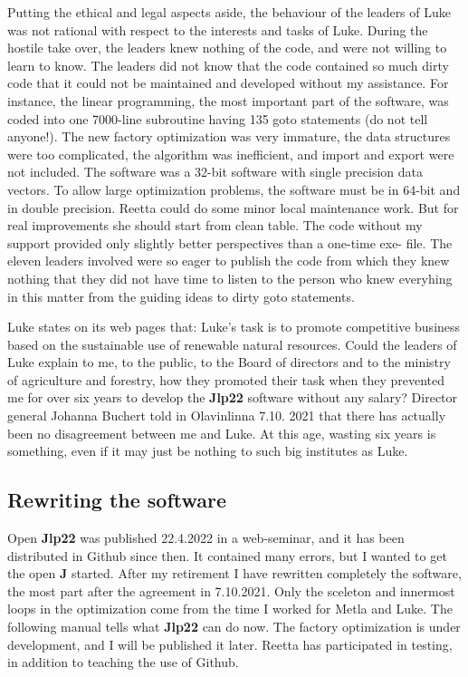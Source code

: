  
Putting the ethical and legal aspects aside, the behaviour of the leaders of 
Luke was not rational with respect to the interests and tasks of Luke. 
During the hostile take over, the leaders knew nothing of the code, and were not willing to 
learn to know. 
The leaders did not know that 
the code contained so much dirty code 
that it could not be maintained and developed without my assistance. 
For instance, the linear programming, the most important part of the software, 
was coded into one 7000-line subroutine having 135 goto statements (do not tell anyone!). 
The new factory optimization was very immature, 
the data structures were too complicated, the algorithm was inefficient, 
and import and export were not included. 
The software was a 32-bit software with single precision data vectors. To allow 
large optimization problems, the software must be 
in 64-bit and in double precision. 
Reetta could do some minor local maintenance work. But for 
real improvements she should 
start from clean table. 
The code without my support 
provided only slightly better perspectives than a one-time exe- file. 
The eleven leaders involved  were so eager to publish the code from which they knew nothing 
that they did not have time to listen to the person who knew everyhing in this matter 
from the guiding ideas to dirty goto statements. 
 
Luke states on its web pages that: 
Luke’s task is to promote competitive business based on the sustainable use of renewable natural resources. 
Could the leaders of Luke explain to me, to the public, to the Board of directors and to the ministry of 
agriculture and forestry, how they promoted their task when they 
prevented me for over six years to develop the \textbf{Jlp22} software without any salary? 
Director general Johanna Buchert told in Olavinlinna 7.10. 2021 that 
there has actually been no disagreement between me and Luke. At this age, wasting six years is 
something, even if it may just be nothing to such big institutes as Luke. 
 
 
 
 
\subsection*{Rewriting the software} 
 
Open \textbf{Jlp22} was published 22.4.2022 in a web-seminar, and it has been distributed in Github since then. 
It contained many errors, but I wanted to get the open \textbf{J} started. 
After my retirement I have rewritten completely the software, 
the most part after the agreement in 7.10.2021. 
Only the sceleton and innermost loops in the optimization come from the time I worked 
for Metla and Luke. The following manual tells what \textbf{Jlp22} can do now. 
The factory optimization is under development, and I will be published it later. 
Reetta has participated 
in testing, in addition to teaching the use of Github. 
 
